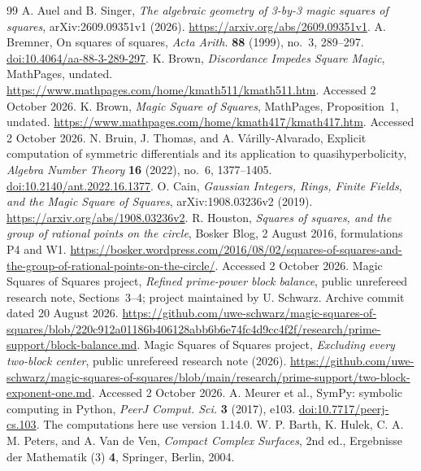 \begin{thebibliography}{99}
\small
{} A. Auel and B. Singer, \emph{The algebraic geometry of 3-by-3 magic squares of squares}, arXiv:2609.09351v1 (2026). \url{https://arxiv.org/abs/2609.09351v1}.
 A. Bremner, On squares of squares, \emph{Acta Arith.} \textbf{88} (1999), no.~3, 289--297. \href{https://doi.org/10.4064/aa-88-3-289-297}{doi:10.4064/aa-88-3-289-297}.
 K. Brown, \emph{Discordance Impedes Square Magic}, MathPages, undated. \url{https://www.mathpages.com/home/kmath511/kmath511.htm}. Accessed 2 October 2026.
 K. Brown, \emph{Magic Square of Squares}, MathPages, Proposition~1, undated. \url{https://www.mathpages.com/home/kmath417/kmath417.htm}. Accessed 2 October 2026.
 N. Bruin, J. Thomas, and A. V\'arilly-Alvarado, Explicit computation of symmetric differentials and its application to quasihyperbolicity, \emph{Algebra Number Theory} \textbf{16} (2022), no.~6, 1377--1405. \href{https://doi.org/10.2140/ant.2022.16.1377}{doi:10.2140/ant.2022.16.1377}.
 O. Cain, \emph{Gaussian Integers, Rings, Finite Fields, and the Magic Square of Squares}, arXiv:1908.03236v2 (2019). \url{https://arxiv.org/abs/1908.03236v2}.
 R. Houston, \emph{Squares of squares, and the group of rational points on the circle}, Bosker Blog, 2 August 2016, formulations P4 and W1. \url{https://bosker.wordpress.com/2016/08/02/squares-of-squares-and-the-group-of-rational-points-on-the-circle/}. Accessed 2 October 2026.
 Magic Squares of Squares project, \emph{Refined prime-power block balance}, public unrefereed research note, Sections~3--4; project maintained by U. Schwarz. Archive commit dated 20 August 2026. \url{https://github.com/uwe-schwarz/magic-squares-of-squares/blob/220c912a01186b406128abb6b6e74fc4d9cc4f2f/research/prime-support/block-balance.md}.
 Magic Squares of Squares project, \emph{Excluding every two-block center}, public unrefereed research note (2026). \url{https://github.com/uwe-schwarz/magic-squares-of-squares/blob/main/research/prime-support/two-block-exponent-one.md}. Accessed 2 October 2026.
 A. Meurer et al., SymPy: symbolic computing in Python, \emph{PeerJ Comput. Sci.} \textbf{3} (2017), e103. \href{https://doi.org/10.7717/peerj-cs.103}{doi:10.7717/peerj-cs.103}. The computations here use version 1.14.0.
 W. P. Barth, K. Hulek, C. A. M. Peters, and A. Van de Ven, \emph{Compact Complex Surfaces}, 2nd ed., Ergebnisse der Mathematik (3) \textbf{4}, Springer, Berlin, 2004.

\end{thebibliography}

